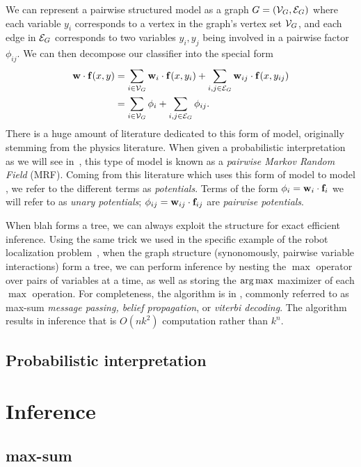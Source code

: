 We can represent a pairwise structured model as a graph $G = (\mathcal{V}_G,\mathcal{E}_G)$ where each variable $y_i$ corresponds to a vertex in the graph's vertex set $\mathcal{V}_G$, and each edge in $\mathcal{E}_G$ corresponds to two variables $y_i,y_j$ being involved in a pairwise factor $\phi_{ij}$.  We can then decompose our classifier into the special form
\begin{align}
\mathbf{w} \cdot \mathbf{f}(x,y) &= \sum_{i \in \mathcal{V}_G} \mathbf{w}_i \cdot \mathbf{f}(x,y_i) + \sum_{i,j \in \mathcal{E}_G} \mathbf{w}_{ij} \cdot \mathbf{f}(x,y_{ij}) \\
& = \sum_{i \in \mathcal{V}_G} \phi_i + \sum_{i,j \in \mathcal{E}_G} \phi_{ij}.
\end{align} 
There is a huge amount of literature dedicated to this form of model, originally stemming from the physics literature.  When given a probabilistic interpretation as we will see in~, this type of model is known as a {\em pairwise Markov Random Field} (MRF).  Coming from this literature which uses this form of model to model , we refer to the different terms as {\em potentials}.  Terms of the form $\phi_i = \mathbf{w}_i \cdot \mathbf{f}_i$ we will refer to as {\em unary potentials}; $\phi_{ij} = \mathbf{w}_{ij} \cdot \mathbf{f}_{ij}$ are {\em pairwise potentials}.

When blah forms a tree, we can always exploit the structure for exact efficient inference.  Using the same trick we used in the specific example of the robot localization problem~, when the graph structure (synonomously, pairwise variable interactions) form a tree, we can perform inference by nesting the $\max$ operator over pairs of variables at a time, as well as storing the $\mathop{\arg\max}$ maximizer of each $\max$ operation.  For completeness, the algorithm is in , commonly referred to as max-sum {\em message passing, belief propagation}, or {\em viterbi decoding}.  The algorithm results in inference that is $O(nk^2)$ computation rather than $k^n$.



\subsection{Probabilistic interpretation}\label{sec:probinterp}

\section{Inference}
\subsection{max-sum}
